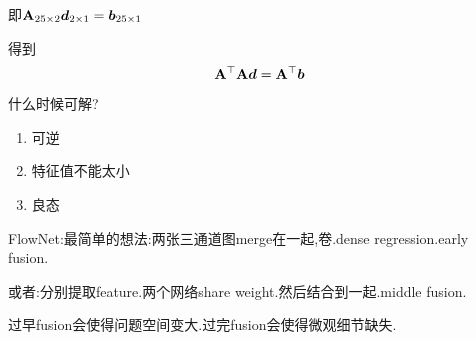 	即$\bold{A}_{25\times 2} \boldsymbol d_{2\times 1} = \boldsymbol b_{25\times 1}$
	
	得到
	\begin{equation}
		\bold{A}^\top \bold{A} \boldsymbol d = \bold{A}^\top \boldsymbol b
	\end{equation}

	什么时候可解?
	\begin{enumerate}
		\item 可逆
		\item 特征值不能太小
		\item 良态
	\end{enumerate}

	FlowNet:最简单的想法:两张三通道图merge在一起,卷.dense regression.early fusion.
	
	或者:分别提取feature.两个网络share weight.然后结合到一起.middle fusion.
	
	过早fusion会使得问题空间变大.过完fusion会使得微观细节缺失.
	